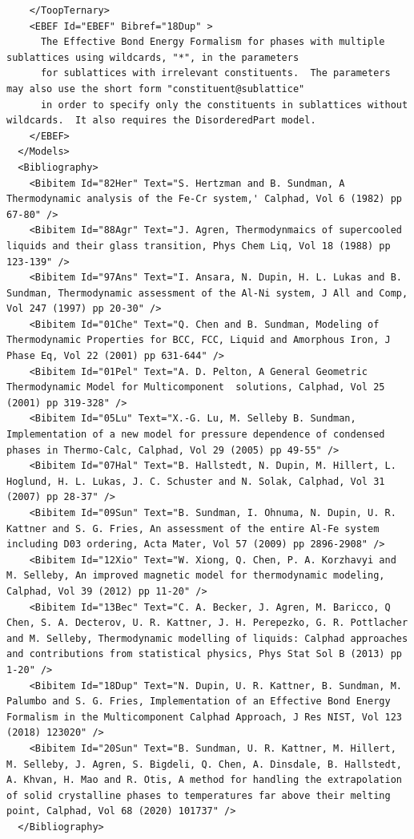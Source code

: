 \documentclass{article}
\begin{document}
\begin{appendices}
{\begin{verbatim}
    </ToopTernary>
    <EBEF Id="EBEF" Bibref="18Dup" > 
      The Effective Bond Energy Formalism for phases with multiple sublattices using wildcards, "*", in the parameters
      for sublattices with irrelevant constituents.  The parameters may also use the short form "constituent@sublattice" 
      in order to specify only the constituents in sublattices without wildcards.  It also requires the DisorderedPart model.
    </EBEF>
  </Models>
  <Bibliography> 
    <Bibitem Id="82Her" Text="S. Hertzman and B. Sundman, A Thermodynamic analysis of the Fe-Cr system,' Calphad, Vol 6 (1982) pp 67-80" />
    <Bibitem Id="88Agr" Text="J. Agren, Thermodynmaics of supercooled liquids and their glass transition, Phys Chem Liq, Vol 18 (1988) pp 123-139" />
    <Bibitem Id="97Ans" Text="I. Ansara, N. Dupin, H. L. Lukas and B. Sundman, Thermodynamic assessment of the Al-Ni system, J All and Comp, Vol 247 (1997) pp 20-30" />
    <Bibitem Id="01Che" Text="Q. Chen and B. Sundman, Modeling of Thermodynamic Properties for BCC, FCC, Liquid and Amorphous Iron, J Phase Eq, Vol 22 (2001) pp 631-644" />
    <Bibitem Id="01Pel" Text="A. D. Pelton, A General Geometric Thermodynamic Model for Multicomponent  solutions, Calphad, Vol 25 (2001) pp 319-328" />
    <Bibitem Id="05Lu" Text="X.-G. Lu, M. Selleby B. Sundman, Implementation of a new model for pressure dependence of condensed phases in Thermo-Calc, Calphad, Vol 29 (2005) pp 49-55" />
    <Bibitem Id="07Hal" Text="B. Hallstedt, N. Dupin, M. Hillert, L. Hoglund, H. L. Lukas, J. C. Schuster and N. Solak, Calphad, Vol 31 (2007) pp 28-37" />
    <Bibitem Id="09Sun" Text="B. Sundman, I. Ohnuma, N. Dupin, U. R. Kattner and S. G. Fries, An assessment of the entire Al-Fe system including D03 ordering, Acta Mater, Vol 57 (2009) pp 2896-2908" />
    <Bibitem Id="12Xio" Text="W. Xiong, Q. Chen, P. A. Korzhavyi and M. Selleby, An improved magnetic model for thermodynamic modeling, Calphad, Vol 39 (2012) pp 11-20" />
    <Bibitem Id="13Bec" Text="C. A. Becker, J. Agren, M. Baricco, Q Chen, S. A. Decterov, U. R. Kattner, J. H. Perepezko, G. R. Pottlacher and M. Selleby, Thermodynamic modelling of liquids: Calphad approaches and contributions from statistical physics, Phys Stat Sol B (2013) pp 1-20" />
    <Bibitem Id="18Dup" Text="N. Dupin, U. R. Kattner, B. Sundman, M. Palumbo and S. G. Fries, Implementation of an Effective Bond Energy Formalism in the Multicomponent Calphad Approach, J Res NIST, Vol 123 (2018) 123020" />
    <Bibitem Id="20Sun" Text="B. Sundman, U. R. Kattner, M. Hillert, M. Selleby, J. Agren, S. Bigdeli, Q. Chen, A. Dinsdale, B. Hallstedt, A. Khvan, H. Mao and R. Otis, A method for handling the extrapolation of solid crystalline phases to temperatures far above their melting point, Calphad, Vol 68 (2020) 101737" />
  </Bibliography>


\end{verbatim}}
\end{appendices}
\end{document}
